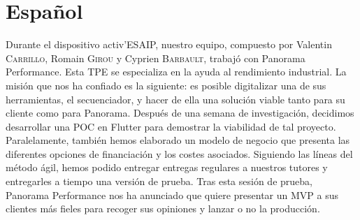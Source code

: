 \section*{Español}

Durante el dispositivo activ'ESAIP, nuestro equipo, compuesto por Valentin \textsc{Carrillo}, Romain \textsc{Girou} y Cyprien \textsc{Barbault}, trabajó con Panorama Performance. Esta TPE se especializa en la ayuda al rendimiento industrial. La misión que nos ha confiado es la siguiente: es posible digitalizar una de sus herramientas, el secuenciador, y hacer de ella una solución viable tanto para su cliente como para Panorama. Después de una semana de investigación, decidimos desarrollar una POC en Flutter para demostrar la viabilidad de tal proyecto. Paralelamente, también hemos elaborado un modelo de negocio que presenta las diferentes opciones de financiación y los costes asociados. Siguiendo las líneas del método ágil, hemos podido entregar entregas regulares a nuestros tutores y entregarles a tiempo una versión de prueba. Tras esta sesión de prueba, Panorama Performance nos ha anunciado que quiere presentar un MVP a sus clientes más fieles para recoger sus opiniones y lanzar o no la producción.
